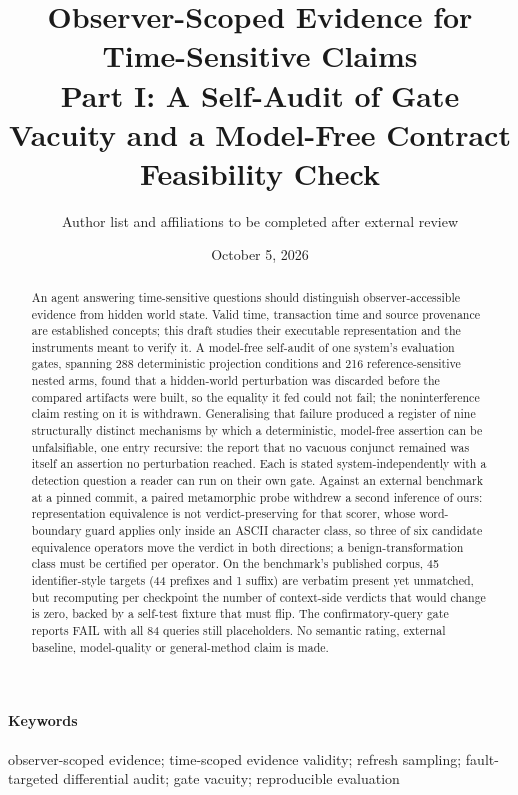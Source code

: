 \documentclass[11pt]{article}
\title{Observer-Scoped Evidence for Time-Sensitive Claims\\\large Part I: A Self-Audit of Gate Vacuity and a Model-Free Contract Feasibility Check}
\author{Author list and affiliations to be completed after external review}
\date{October 5, 2026}
\begin{document}
\maketitle

\begin{abstract}
An agent answering time-sensitive questions should distinguish observer-accessible evidence from hidden world state. Valid time, transaction time and source provenance are established concepts; this draft studies their executable representation and the instruments meant to verify it. A model-free self-audit of one system's evaluation gates, spanning 288 deterministic projection conditions and 216 reference-sensitive nested arms, found that a hidden-world perturbation was discarded before the compared artifacts were built, so the equality it fed could not fail; the noninterference claim resting on it is withdrawn. Generalising that failure produced a register of nine structurally distinct mechanisms by which a deterministic, model-free assertion can be unfalsifiable, one entry recursive: the report that no vacuous conjunct remained was itself an assertion no perturbation reached. Each is stated system-independently with a detection question a reader can run on their own gate. Against an external benchmark at a pinned commit, a paired metamorphic probe withdrew a second inference of ours: representation equivalence is not verdict-preserving for that scorer, whose word-boundary guard applies only inside an ASCII character class, so three of six candidate equivalence operators move the verdict in both directions; a benign-transformation class must be certified per operator. On the benchmark's published corpus, 45 identifier-style targets (44 prefixes and 1 suffix) are verbatim present yet unmatched, but recomputing per checkpoint the number of context-side verdicts that would change is zero, backed by a self-test fixture that must flip. The confirmatory-query gate reports FAIL with all 84 queries still placeholders. No semantic rating, external baseline, model-quality or general-method claim is made.
\end{abstract}

\paragraph{Keywords} observer-scoped evidence; time-scoped evidence validity; refresh sampling; fault-targeted differential audit; gate vacuity; reproducible evaluation
\end{document}
